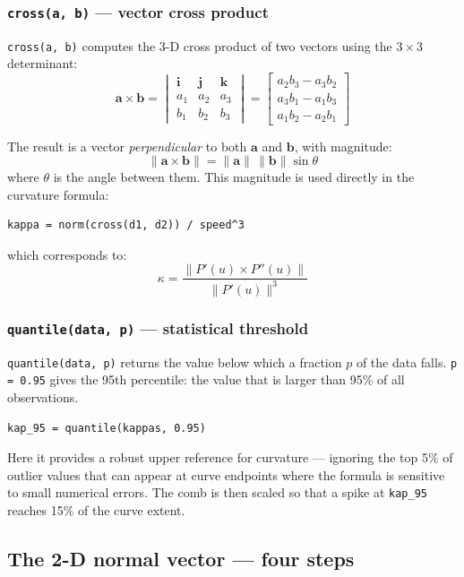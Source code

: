 \documentclass[12pt, a4paper]{article}
\newcommand{\cd}[1]{\texttt{#1}}
\begin{document}
\subsubsection{\texttt{cross(a, b)} --- vector cross product}

\cd{cross(a, b)} computes the 3-D cross product of two
vectors using the $3\times3$ determinant:
\[
  \mathbf{a} \times \mathbf{b}
  = \begin{vmatrix}
      \mathbf{i} & \mathbf{j} & \mathbf{k} \\
      a_1 & a_2 & a_3 \\
      b_1 & b_2 & b_3
    \end{vmatrix}
  = \begin{bmatrix}
      a_2 b_3 - a_3 b_2 \\
      a_3 b_1 - a_1 b_3 \\
      a_1 b_2 - a_2 b_1
    \end{bmatrix}
\]

The result is a vector \emph{perpendicular} to both
$\mathbf{a}$ and $\mathbf{b}$, with magnitude:
\[
  \|\mathbf{a} \times \mathbf{b}\| = \|\mathbf{a}\|\,\|\mathbf{b}\|\sin\theta
\]
where $\theta$ is the angle between them.
This magnitude is used directly in the curvature formula:
\begin{verbatim}
kappa = norm(cross(d1, d2)) / speed^3
\end{verbatim}
which corresponds to:
\[
  \kappa = \frac{\|P'(u) \times P''(u)\|}{\|P'(u)\|^3}
\]

\subsubsection{\texttt{quantile(data, p)} --- statistical threshold}

\cd{quantile(data, p)} returns the value below which
a fraction $p$ of the data falls.
\cd{p = 0.95} gives the 95th percentile: the value
that is larger than 95\% of all observations.

\begin{verbatim}
kap_95 = quantile(kappas, 0.95)
\end{verbatim}

Here it provides a robust upper reference for curvature ---
ignoring the top 5\% of outlier values that can appear
at curve endpoints where the formula is sensitive to
small numerical errors.
The comb is then scaled so that a spike at \cd{kap\_95}
reaches 15\% of the curve extent.

\subsection{The 2-D normal vector --- four steps}
\end{document}
